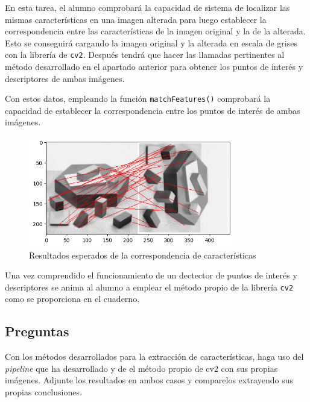En esta tarea, el alumno comprobará la capacidad de sistema de localizar las mismas características en una imagen alterada para luego establecer la correspondencia entre las características de la imagen original y la de la alterada. Esto se conseguirá cargando la imagen original y la alterada en escala de grises con la librería de \texttt{cv2}. Después tendrá que hacer las llamadas pertinentes al método desarrollado en el apartado anterior para obtener los puntos de interés y descriptores de ambas imágenes. 

Con estos datos, empleando la función \texttt{matchFeatures()} comprobará la capacidad de establecer la correspondencia entre los puntos de interés de ambas imágenes.

\begin{figure}[h]
    \centering
    \includegraphics[width=0.8\textwidth]{Lab_3/template/figures/FeatureMatchMine.png}
    \caption{Resultados esperados de la correspondencia de características}
    \label{fig:FMatchEnd}
\end{figure}

Una vez comprendido el funcionamiento de un dectector de puntos de interés y descriptores se anima al alumno a emplear el método propio de la librería \texttt{cv2} como se proporciona en el cuaderno.


\subsection*{Preguntas}

\vspace{5mm}
\begin{tcolorbox}[colback=gray!10, colframe=gray!30, coltitle=black, title=Pregunta C.1: Correspodencia de imágenes propias y evaluación, halign=left]
Con los métodos desarrollados para la extracción de características, haga uso del \textit{pipeline} que ha desarrollado y de el método propio de cv2 con sus propias imágenes. Adjunte los resultados en ambos casos y comparelos extrayendo sus propias conclusiones.
\end{tcolorbox}

